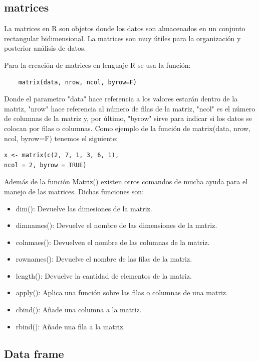 \documentclass[twoside,twocolumn]{article}
\begin{document}
\subsection{matrices}

La matrices en R son objetos donde los datos son almacenados en un conjunto rectangular bidimensional. La matrices son muy útiles para la organización y posterior análisis de datos. 

Para la creación de matrices en lenguaje R se usa la función:
\begin{verbatim}
    matrix(data, nrow, ncol, byrow=F)
\end{verbatim}
Donde el parametro "data" hace referencia a los valores estarán dentro de la matriz, "nrow" hace referencia al número de filas de la matriz, "ncol" es el número de columnas de la matriz y, por último, "byrow" sirve para indicar si los datos se colocan por filas o columnas. Como ejemplo de la función de matrix(data, nrow, ncol, byrow=F) tenemos el siguiente:

\begin{verbatim}
x <- matrix(c(2, 7, 1, 3, 6, 1), 
ncol = 2, byrow = TRUE)  
\end{verbatim}

Además de la función Matriz() existen otros comandos de mucha ayuda para el manejo de las matrices. Dichas funciones son: 

\begin {itemize}
\item dim(): Devuelve las dimesiones de la matriz.
\item dimnames(): Devuelve el nombre de las dimensiones de la matriz.
\item colnmaes(): Devuelven el nombre de las columnas de la matriz.
\item rownames(): Devuelve el nombre de las filas de la matriz.
\item length(): Devuelve la cantidad de elementos de la matriz.
\item apply(): Aplica una función sobre las filas o columnas de una matriz.
\item cbind(): Añade una columna a la matriz.
\item rbind(): Añade una fila a la matriz.
\end {itemize}

\subsection{Data frame}
\end{document}
